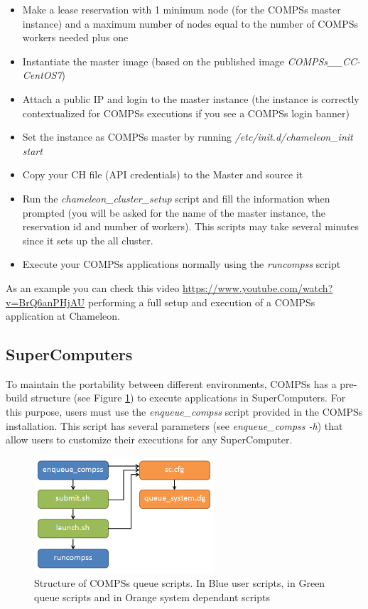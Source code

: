 \begin{itemize}
 \item Make a lease reservation with 1 minimum node (for the COMPSs master instance) and a maximum number of nodes equal to the
 number of COMPSs workers needed plus one
 \item Instantiate the master image (based on the published image \textit{COMPSs\_\compssversion\_CC-CentOS7})
 \item Attach a public IP and login to the master instance (the instance is correctly contextualized for COMPSs executions if you
 see a COMPSs login banner)
 \item Set the instance as COMPSs master by running \textit{/etc/init.d/chameleon\_init start}
 \item Copy your CH file (API credentials) to the Master and source it
 \item Run the \textit{chameleon\_cluster\_setup} script and fill the information when prompted (you will be asked for the name of the
 master instance, the reservation id and number of workers). This scripts may take several minutes since it sets up the all cluster.
 \item Execute your COMPSs applications normally using the \textit{runcompss} script
\end{itemize}

As an example you can check this video \url{https://www.youtube.com/watch?v=BrQ6anPHjAU} performing a full setup and 
execution of a COMPSs application at Chameleon.


\subsection{SuperComputers}

To maintain the portability between different environments, COMPSs has a pre-build structure (see Figure 
\ref{fig:queue_scripts_structure}) to execute applications in SuperComputers. For this purpose, users must use 
the \textit{enqueue\_compss} script provided in the COMPSs installation. This script has several parameters (see 
\textit{enqueue\_compss -h}) that allow users to customize their executions for any SuperComputer.

\begin{figure}[h!]
  \centering
    \includegraphics[width=0.6\textwidth]{./Sections/5_Execution_Platforms/Figures/queue_scripts_structure.png}
    \caption{Structure of COMPSs queue scripts. In Blue user scripts, in Green queue scripts and in Orange system dependant scripts}
    \label{fig:queue_scripts_structure}
\end{figure}

